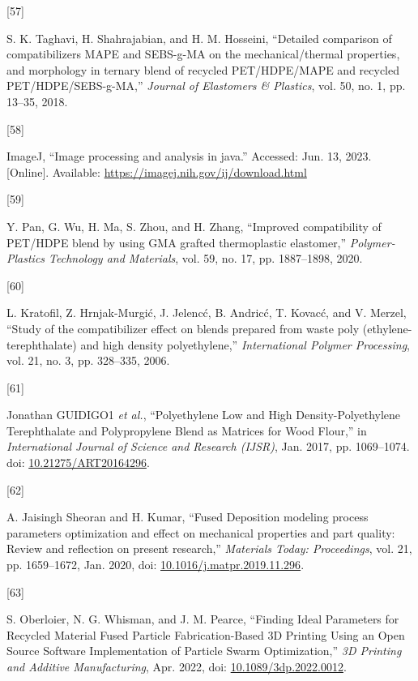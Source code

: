 \documentclass[
]{article}
\newlength{\cslhangindent}
\newlength{\csllabelwidth}
\newlength{\cslentryspacingunit} %
\newenvironment{CSLReferences}[2] %
 {%
  \setlength{\parindent}{0pt}
  \ifodd #1
  \let\oldpar\par
  \def\par{\hangindent=\cslhangindent\oldpar}
  \fi
  \setlength{\parskip}{#2\cslentryspacingunit}
 }%
 {}
\newcommand{\CSLLeftMargin}[1]{\parbox[t]{\csllabelwidth}{#1}}
\newcommand{\CSLRightInline}[1]{\parbox[t]{\linewidth - \csllabelwidth}{#1}\break}
\begin{document}
\begin{CSLReferences}{0}{0}
\leavevmode{}%
\CSLLeftMargin{{[}57{]} }%
\CSLRightInline{S. K. Taghavi, H. Shahrajabian, and H. M. Hosseini,
{``Detailed comparison of compatibilizers MAPE and SEBS-g-MA on the
mechanical/thermal properties, and morphology in ternary blend of
recycled PET/HDPE/MAPE and recycled PET/HDPE/SEBS-g-MA,''} \emph{Journal
of Elastomers \& Plastics}, vol. 50, no. 1, pp. 13--35, 2018.}

\leavevmode{}%
\CSLLeftMargin{{[}58{]} }%
\CSLRightInline{ImageJ, {``Image processing and analysis in java.''}
Accessed: Jun. 13, 2023. {[}Online{]}. Available:
\url{https://imagej.nih.gov/ij/download.html}}

\leavevmode{}%
\CSLLeftMargin{{[}59{]} }%
\CSLRightInline{Y. Pan, G. Wu, H. Ma, S. Zhou, and H. Zhang, {``Improved
compatibility of PET/HDPE blend by using GMA grafted thermoplastic
elastomer,''} \emph{Polymer-Plastics Technology and Materials}, vol. 59,
no. 17, pp. 1887--1898, 2020.}

\leavevmode{}%
\CSLLeftMargin{{[}60{]} }%
\CSLRightInline{L. Kratofil, Z. Hrnjak-Murgić, J. Jelencć, B. Andricć,
T. Kovacć, and V. Merzel, {``Study of the compatibilizer effect on
blends prepared from waste poly (ethylene-terephthalate) and high
density polyethylene,''} \emph{International Polymer Processing}, vol.
21, no. 3, pp. 328--335, 2006.}

\leavevmode{}%
\CSLLeftMargin{{[}61{]} }%
\CSLRightInline{Jonathan GUIDIGO1 \emph{et al.}, {``Polyethylene {Low}
and {High Density-Polyethylene Terephthalate} and {Polypropylene Blend}
as {Matrices} for {Wood Flour},''} in \emph{International {Journal} of
{Science} and {Research} ({IJSR})}, Jan. 2017, pp. 1069--1074. doi:
\href{https://doi.org/10.21275/ART20164296}{10.21275/ART20164296}.}

\leavevmode{}%
\CSLLeftMargin{{[}62{]} }%
\CSLRightInline{A. Jaisingh Sheoran and H. Kumar, {``Fused {Deposition}
modeling process parameters optimization and effect on mechanical
properties and part quality: {Review} and reflection on present
research,''} \emph{Materials Today: Proceedings}, vol. 21, pp.
1659--1672, Jan. 2020, doi:
\href{https://doi.org/10.1016/j.matpr.2019.11.296}{10.1016/j.matpr.2019.11.296}.}

\leavevmode{}%
\CSLLeftMargin{{[}63{]} }%
\CSLRightInline{S. Oberloier, N. G. Whisman, and J. M. Pearce,
{``Finding {Ideal Parameters} for {Recycled Material Fused Particle
Fabrication-Based 3D Printing Using} an {Open Source Software
Implementation} of {Particle Swarm Optimization},''} \emph{3D Printing
and Additive Manufacturing}, Apr. 2022, doi:
\href{https://doi.org/10.1089/3dp.2022.0012}{10.1089/3dp.2022.0012}.}


\end{CSLReferences}
\end{document}
